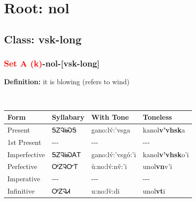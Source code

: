 \needspace{4in}
\section*{Root: nol}
\nopagebreak
{}
\needspace{3in}
\subsection*{Class: vsk-long}
\nopagebreak
\needspace{2in}
\subsubsection*{\textcolor{Red}{Set A (k)}{-}\textbf{nol}{-}[vsk-long]}
\nopagebreak
\textbf{Definition: } it is blowing (refers to wind)
\\[0.5em]
\begin{tabularx}{\textwidth}{l X X X}%
\toprule%
\textbf{Form}&\textbf{Syllabary}&\textbf{With Tone}&\textbf{Toneless}\\%
\midrule%
Present&ᎦᏃᎸᎥᏍᎦ&gano:lv́:’vsga&kanol\textbf{v'vhsk}a\\%
1st Present&{-}{-}{-}&{-}{-}{-}&{-}{-}{-}\\%
Imperfective&ᎦᏃᎸᎥᏍᎪᎢ&gano:lv́:’vsgó:’i&kanol\textbf{v'vhsk}o'i\\%
Perfective&ᎤᏃᎸᏅᎢ&ù:no:lv́:nv̌:’i&unol\textbf{vn}v'i\\%
Imperative&{-}{-}{-}&{-}{-}{-}&{-}{-}{-}\\%
Infinitive&ᎤᏃᎸᏗ&u:no:lv̀:di&unol\textbf{vt}i\\%
\bottomrule%
\end{tabularx}
\\[1em]